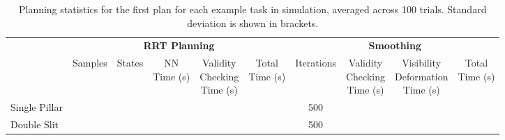 \begin{table*}[t]
\centering
\caption{Planning statistics for the first plan for each example task in simulation, averaged across 100 trials. Standard deviation is shown in brackets.}
\label{tab:planning_statistics}
\begin{tabular}{lccccc|cccc}
\hline
    & \multicolumn{5}{c}{\textbf{RRT Planning}} & \multicolumn{4}{|c}{\textbf{Smoothing}} \\
    & Samples & States & \parbox{0.3in}{\centering NN\\Time (s)} & \parbox{0.55in}{\centering Validity\\Checking\\Time (s)} & \parbox{0.3in}{\centering Total\\Time (s)} & Iterations & \parbox{0.55in}{\centering Validity\\Checking\\Time (s)} & \parbox{0.75in}{\centering Visibility\\Deformation\\Time (s)}& \parbox{0.3in}{\centering \smallskip Total\\Time (s) \smallskip} \\
\hline
Single Pillar                       & \parbox{0.37in}{} & \parbox{0.37in}{} & \parbox{0.4in}{} & \parbox{0.4in}{} & \parbox{0.3in}{} &  500 & \parbox{0.5in}{} & \parbox{0.4in}{}       & \parbox{0.3in}{\smallskip{}\smallskip} \\

Double Slit                         & \parbox{0.37in}{} & \parbox{0.37in}{} & \parbox{0.4in}{} & \parbox{0.4in}{} & \parbox{0.3in}{} &  500 & \parbox{0.5in}{} & \parbox{0.4in}{} & \parbox{0.3in}{\smallskip{}\smallskip} \\


\end{tabular}
\end{table*}
